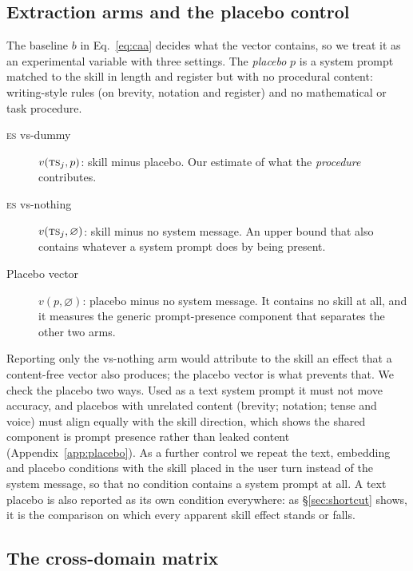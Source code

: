 \documentclass[11pt]{article}
\newcommand{\TS}{\textsc{ts}}
\newcommand{\ES}{\textsc{es}}
\begin{document}
\subsection{Extraction arms and the placebo control}
\label{sec:arms}

The baseline $b$ in Eq.~\ref{eq:caa} decides what the vector contains, so we treat it as an
experimental variable with three settings. The \emph{placebo} $p$ is a system prompt matched to the
skill in length and register but with no procedural content: writing-style rules (on brevity,
notation and register) and no mathematical or task procedure.

\begin{description}
  \item[\ES{} vs-dummy] $v(\TS_j, p)$: skill minus placebo. Our estimate of what the
  \emph{procedure} contributes.
  \item[\ES{} vs-nothing] $v(\TS_j, \varnothing)$: skill minus no system message. An upper bound that
  also contains whatever a system prompt does by being present.
  \item[Placebo vector] $v(p, \varnothing)$: placebo minus no system message. It contains no skill at
  all, and it measures the generic prompt-presence component that separates the other two arms.
\end{description}

Reporting only the vs-nothing arm would attribute to the skill an effect that a content-free vector
also produces; the placebo vector is what prevents that. We check the placebo two ways. Used as a
text system prompt it must not move accuracy, and placebos with unrelated content (brevity; notation;
tense and voice) must align equally with the skill direction, which shows the shared component is
prompt presence rather than leaked content (Appendix~\ref{app:placebo}). As a further control we
repeat the text, embedding and placebo conditions with the skill placed in the user turn instead of
the system message, so that no condition contains a system prompt at all. A text placebo is also
reported as its own condition everywhere: as \S\ref{sec:shortcut} shows, it is the comparison on
which every apparent skill effect stands or falls.

\subsection{The cross-domain matrix}
\label{sec:matrixdesign}
\end{document}
